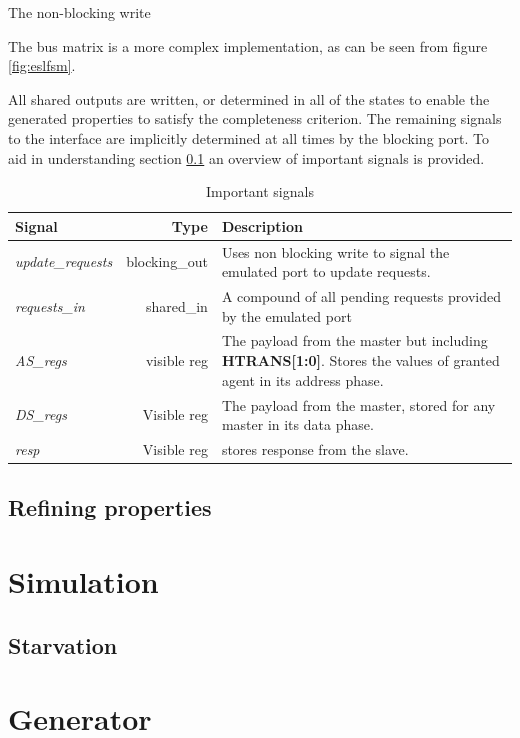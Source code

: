 The non-blocking write 


The bus matrix is a more complex implementation, as can be seen from figure \ref{fig:eslfsm}.

 All shared outputs are written, or determined in all of the states to enable the generated properties to satisfy the completeness criterion. The remaining signals to the interface are implicitly determined at all times by the blocking port. To aid in understanding section \ref{sub:refine} an overview of important signals is provided. 

\begin{table}[hbt] 
  \begin{tabular}{|p{3cm}|r|p{7cm}|} 
 \label{tab:impsig}
  \hline
  \textbf{Signal} & \textbf{Type} & \textbf{Description} \\
    \hline
  \textit{update\_requests} & blocking\_out & Uses non blocking write to signal the emulated port to update requests. \\
    \hline
  \textit{requests\_in} & shared\_in & A compound of all pending requests provided by the emulated port \\
    \hline
  \textit{AS\_regs} & visible reg & The payload from the master but including \textbf{HTRANS[1:0]}. Stores the values of granted agent in its address phase. \\
    \hline  
\textit{DS\_regs} & Visible reg & The payload from the master, stored for any master in its data phase.  \\
    \hline
\textit{resp} & Visible reg & stores response from the slave. \\
    \hline
  \end{tabular}
\caption{Important signals}
\end{table}
  

\subsection{Refining properties}
\label{sub:refine}



\section{Simulation}
\label{sec:sim}

\subsection{Starvation}

\section{Generator}
\label{sec:generator}
